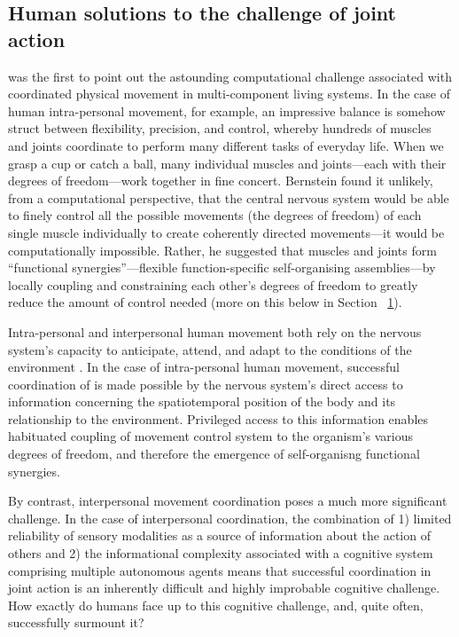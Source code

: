 \begin{CJK}{UTF8}{gbsn}
\section{Human solutions to the challenge of joint action\label{sect:dfProblem}}

\textcite{Bernstein1967} was the first to point out the astounding computational challenge associated with coordinated physical movement in multi-component living systems.  In the case of human intra-personal movement, for example, an impressive balance is somehow struct between flexibility, precision, and control, whereby hundreds of muscles and joints coordinate to perform many different tasks of everyday life.  When we grasp a cup or catch a ball, many individual muscles and joints---each with their degrees of freedom---work together in fine concert.  Bernstein found it unlikely, from a computational perspective, that the central nervous system would be able to finely control all the possible movements (the degrees of freedom) of each single muscle individually to create coherently directed movements---it would be computationally impossible. Rather, he suggested that muscles and joints form  ``functional synergies''---flexible function-specific self-organising assemblies---by locally coupling and constraining each other’s degrees of freedom to greatly reduce the amount of control needed (more on this below in Section ~\ref{}).

Intra-personal and interpersonal human movement both rely on the nervous system’s capacity to anticipate, attend, and adapt to the conditions of the environment \citep{Keller2014}.  In the case of intra-personal human movement, successful coordination of is made possible by the nervous system's direct access to information concerning the spatiotemporal position of the body and its relationship to the environment.  Privileged access to this information enables habituated coupling of movement control system to the organism's various degrees of freedom, and therefore the emergence of self-organisng functional synergies.

By contrast, interpersonal movement coordination poses a much more significant challenge.  In the case of interpersonal coordination, the combination of 1) limited reliability of sensory modalities as a source of information about the action of others \citep{Wilson2005,Wolpert2003,Frith2007} and 2) the informational complexity associated with a cognitive system comprising multiple autonomous agents \citep{Bernstein1967} means that successful coordination in joint action is an inherently difficult and highly improbable cognitive challenge.  How exactly do humans face up to this cognitive challenge, and, quite often, successfully surmount it?


\end{CJK}
